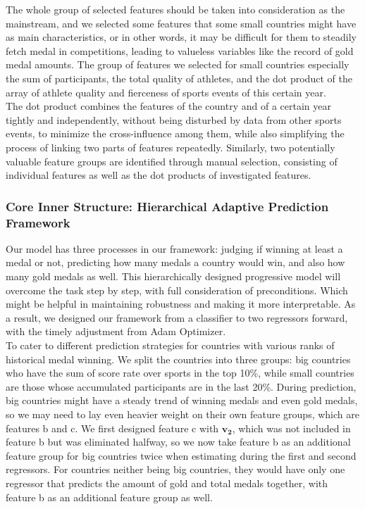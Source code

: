 \documentclass[12pt]{article}
\begin{document}
The whole group of selected features should be taken into consideration as the mainstream, and we selected some features that some small countries might have as main characteristics, or in other words, it may be difficult for them to steadily fetch medal in competitions, leading to valueless variables like the record of gold medal amounts. The group of features we selected for small countries especially the sum of participants, the total quality of athletes, and the dot product of the array of athlete quality and fierceness of sports events of this certain year.\\

The dot product combines the features of the country and of a certain year tightly and independently, without being disturbed by data from other sports events, to minimize the cross-influence among them, while also simplifying the process of linking two parts of features repeatedly. 
Similarly, two potentially valuable feature groups are identified through manual selection, consisting of individual features as well as the dot products of investigated features.\\


\subsubsection{Core Inner Structure: Hierarchical Adaptive Prediction Framework}

\quad \quad Our model has three processes in our framework: judging if winning at least a medal or not, predicting how many medals a country would win, and also how many gold medals as well. This hierarchically designed progressive model will overcome the task step by step, with full consideration of preconditions. Which might be helpful in maintaining robustness and making it more interpretable. As a result, we designed our framework from a classifier to two regressors forward,  with the timely adjustment from Adam Optimizer.\\

To cater to different prediction strategies for countries with various 
ranks of historical medal winning. We split the countries into three groups: big countries who have the sum of score rate over sports in the top 10\%, while small countries are those whose accumulated participants are in the last 20\%. During prediction, big countries might have a steady trend of winning medals and even gold medals, so we may need to lay even heavier weight on their own feature groups, which are features b and c. We first designed feature c with $ \bm{v_2} $, which was not included in feature b but was eliminated halfway, so we now take feature b as an additional feature group for big countries twice when estimating during the first and second regressors. For countries neither being big countries, they would have only one regressor that predicts the amount of gold and total medals together, with feature b as an additional feature group as well.\\ 
\end{document}

